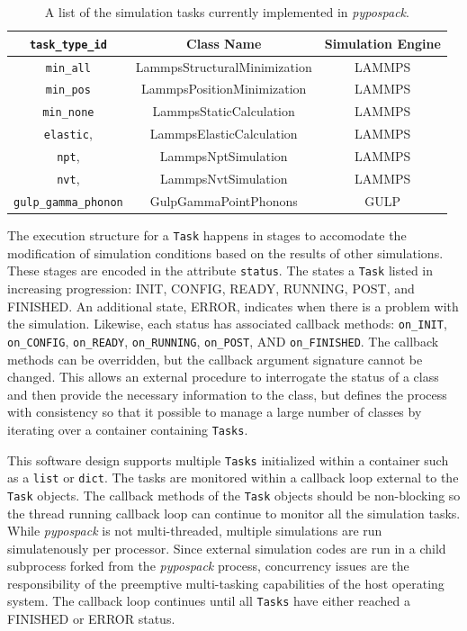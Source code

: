 \begin{table}[ht]
	\centering
	\caption{A list of the simulation tasks currently implemented in \emph{pypospack}.}
	\label{tbl:pypospack_tasks}
	\begin{tabular}{ccc}
		\hline
		\verb|task_type_id|
		& Class Name
		& Simulation Engine \\
		\hline
    \verb|min_all|
		& LammpsStructuralMinimization
		& LAMMPS
		\\
		\verb|min_pos|
		& LammpsPositionMinimization
    & LAMMPS
		\\
		\verb|min_none|
		& LammpsStaticCalculation
    & LAMMPS
		\\
		\verb|elastic|,
		& LammpsElasticCalculation
		& LAMMPS
		\\
    \verb|npt|,
		& LammpsNptSimulation
		& LAMMPS
		\\
		\verb|nvt|,
		& LammpsNvtSimulation
		& LAMMPS
		\\
    \verb|gulp_gamma_phonon|
		& GulpGammaPointPhonons
		& GULP
		\\
		\hline
	\end{tabular}
\end{table}

The execution structure for a \verb|Task| happens in stages to accomodate the modification of simulation conditions based on the results of other simulations.  These stages are encoded in the attribute \verb|status|.  The states a \verb|Task| listed in increasing progression: INIT, CONFIG, READY, RUNNING, POST, and FINISHED.  An additional state, ERROR, indicates when there is a problem with the simulation.  Likewise, each status has associated callback methods: \verb|on_INIT|, \verb|on_CONFIG|, \verb|on_READY|, \verb|on_RUNNING|, \verb|on_POST|, AND \verb|on_FINISHED|.  The callback methods can be overridden, but the callback argument signature cannot be changed.  This allows an external procedure to interrogate the status of a class and then provide the necessary information to the class, but defines the process with consistency so that it possible to manage a large number of classes by iterating over a container containing \verb|Tasks|.

This software design supports multiple \verb|Tasks| initialized within a container such as a \verb|list| or \verb|dict|.  The tasks are monitored within a callback loop external to the \verb|Task| objects.  The callback methods of the \verb|Task| objects should be non-blocking so the thread running callback loop can continue to monitor all the simulation tasks.  While \emph{pypospack} is not multi-threaded, multiple simulations are run simulatenously per processor.  Since external simulation codes are run in a child subprocess forked from the \emph{pypospack} process, concurrency issues are the responsibility of the preemptive multi-tasking capabilities of the host operating system.  The callback loop continues until all \verb|Tasks| have either reached a FINISHED or ERROR status.

